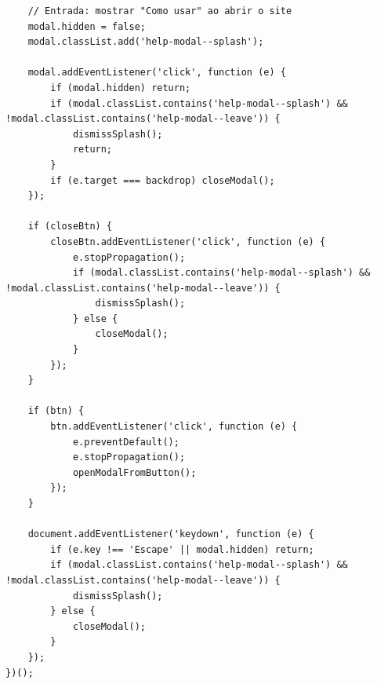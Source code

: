 \begin{verbatim}
    // Entrada: mostrar "Como usar" ao abrir o site
    modal.hidden = false;
    modal.classList.add('help-modal--splash');

    modal.addEventListener('click', function (e) {
        if (modal.hidden) return;
        if (modal.classList.contains('help-modal--splash') && !modal.classList.contains('help-modal--leave')) {
            dismissSplash();
            return;
        }
        if (e.target === backdrop) closeModal();
    });

    if (closeBtn) {
        closeBtn.addEventListener('click', function (e) {
            e.stopPropagation();
            if (modal.classList.contains('help-modal--splash') && !modal.classList.contains('help-modal--leave')) {
                dismissSplash();
            } else {
                closeModal();
            }
        });
    }

    if (btn) {
        btn.addEventListener('click', function (e) {
            e.preventDefault();
            e.stopPropagation();
            openModalFromButton();
        });
    }

    document.addEventListener('keydown', function (e) {
        if (e.key !== 'Escape' || modal.hidden) return;
        if (modal.classList.contains('help-modal--splash') && !modal.classList.contains('help-modal--leave')) {
            dismissSplash();
        } else {
            closeModal();
        }
    });
})();
\end{verbatim}
